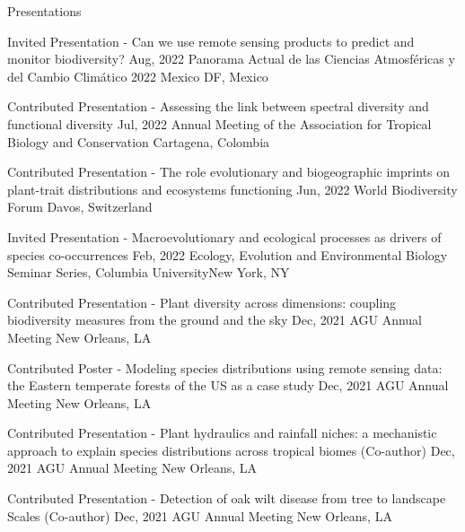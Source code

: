 \documentclass{resume} %
\begin{document}
\begin{rSection}{Presentations}
\begin{sSubsection}{Invited Presentation - Can we use remote sensing products to predict and monitor biodiversity?}{ \hfill }{Aug, 2022}{ Panorama Actual de las Ciencias Atmosféricas y del Cambio Climático 2022 }{Mexico DF, Mexico}
\end{sSubsection}

\begin{sSubsection}{Contributed Presentation - Assessing the link between spectral diversity and functional diversity}{ \hfill }{Jul, 2022}{ Annual Meeting of the Association for Tropical Biology and Conservation }{Cartagena, Colombia}
\end{sSubsection}

\begin{sSubsection}{Contributed Presentation - The role evolutionary and biogeographic imprints on plant-trait distributions and ecosystems functioning}{ \hfill }{Jun, 2022}{ World Biodiversity Forum }{Davos, Switzerland}
\end{sSubsection}

\begin{sSubsection}{Invited Presentation - Macroevolutionary and ecological processes as drivers of species co-occurrences}{ \hfill }{Feb, 2022}{ Ecology, Evolution and Environmental Biology Seminar Series, Columbia University}{New York, NY}
\end{sSubsection}

\begin{sSubsection}{Contributed Presentation - Plant diversity across dimensions: coupling biodiversity measures from the ground and the sky}{ \hfill }{Dec, 2021}{ AGU Annual Meeting }{New Orleans, LA}
\end{sSubsection}

\begin{sSubsection}{Contributed Poster - Modeling species distributions using remote sensing data: the Eastern temperate forests of the US as a case study}{ }{Dec, 2021}{ AGU Annual Meeting }{New Orleans, LA}
\end{sSubsection}

\begin{sSubsection}{Contributed Presentation - Plant hydraulics and rainfall niches: a mechanistic approach to explain species distributions across tropical biomes}{ (Co-author) }{Dec, 2021}{ AGU Annual Meeting }{New Orleans, LA}
\end{sSubsection}

\begin{sSubsection}{Contributed Presentation - Detection of oak wilt disease from tree to landscape Scales}{ (Co-author) }{Dec, 2021}{ AGU Annual Meeting }{New Orleans, LA}
\end{sSubsection}


\end{rSection}
\end{document}
